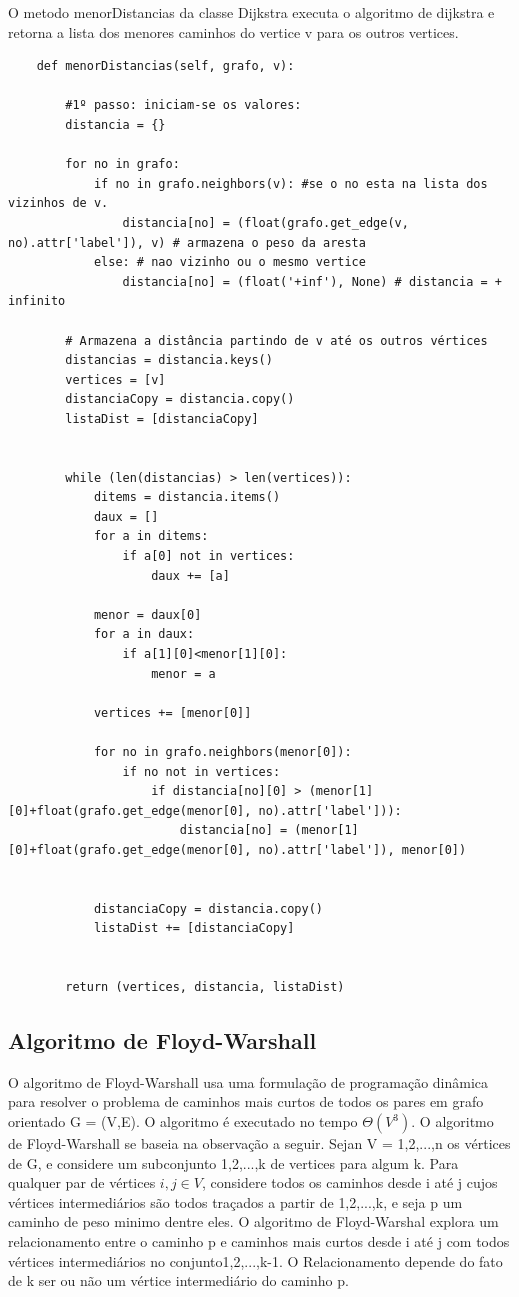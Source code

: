 \documentclass[a4paper,12pt]{article}
\begin{document}
O metodo menorDistancias da classe Dijkstra executa o algoritmo de dijkstra e retorna a lista dos menores caminhos do vertice v para os outros vertices.
\begin{lstlisting}
	def menorDistancias(self, grafo, v):

		#1º passo: iniciam-se os valores:
		distancia = {}
	
		for no in grafo:
			if no in grafo.neighbors(v): #se o no esta na lista dos vizinhos de v.
				distancia[no] = (float(grafo.get_edge(v, no).attr['label']), v) # armazena o peso da aresta
			else: # nao vizinho ou o mesmo vertice
				distancia[no] = (float('+inf'), None) # distancia = + infinito
	
		# Armazena a distância partindo de v até os outros vértices
		distancias = distancia.keys()
		vertices = [v]
		distanciaCopy = distancia.copy()
		listaDist = [distanciaCopy]

				
		while (len(distancias) > len(vertices)):
			ditems = distancia.items()
			daux = []
			for a in ditems:
				if a[0] not in vertices:
					daux += [a]

			menor = daux[0]
			for a in daux:
				if a[1][0]<menor[1][0]:
					menor = a

			vertices += [menor[0]]

			for no in grafo.neighbors(menor[0]):
				if no not in vertices:
					if distancia[no][0] > (menor[1][0]+float(grafo.get_edge(menor[0], no).attr['label'])):
						distancia[no] = (menor[1][0]+float(grafo.get_edge(menor[0], no).attr['label']), menor[0])

			
			distanciaCopy = distancia.copy()
			listaDist += [distanciaCopy]


		return (vertices, distancia, listaDist)
\end{lstlisting}

\subsection{Algoritmo de Floyd-Warshall}
O algoritmo de Floyd-Warshall usa uma formulação de programação dinâmica para resolver o problema de caminhos mais curtos de todos os pares em grafo orientado G = (V,E). O algoritmo é executado no tempo \emph{$\Theta(V^3)$}. 
O algoritmo de Floyd-Warshall se baseia na observação a seguir. Sejan V = {1,2,...,n} os vértices de G, e considere um subconjunto {1,2,...,k} de vertices  para algum k. Para qualquer par de vértices $i,j \in V$, considere todos os caminhos desde i até j cujos vértices intermediários são todos traçados a partir de {1,2,...,k}, e seja p um caminho de peso minimo dentre eles. O algoritmo de Floyd-Warshal explora um relacionamento entre o caminho p e caminhos mais curtos desde i até j com todos vértices intermediários no conjunto{1,2,...,k-1}. O Relacionamento depende do fato de k ser ou não um vértice intermediário do caminho p.
\end{document}
